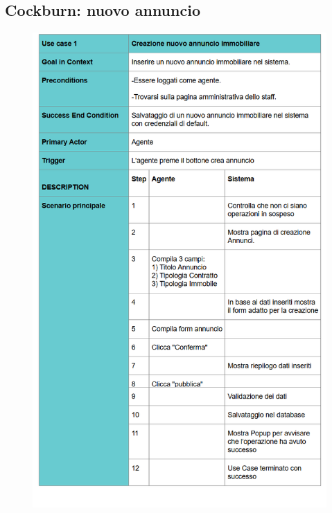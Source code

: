 \subsection{Cockburn: nuovo annuncio}

\begin{figure}[H]
	\centering
	\includegraphics[width=1\linewidth]{"Immagini/cockburn/nuovo annuncio principale.png"}
	\caption[CockBurn extensions: registra nuovo agente]{}
	\label{fig:registra-nuovo-agente-principale}
\end{figure}

\newpage

